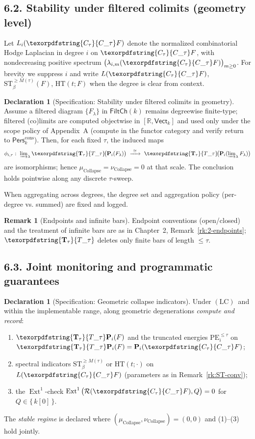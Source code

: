 \documentclass[11pt]{article}
\numberwithin{equation}{section}
\theoremstyle{plain}
\theoremstyle{definition}
\theoremstyle{remark}
\DeclareMathOperator{\Ext}{Ext}
\DeclareRobustCommand{\hyp}{\nobreakdash-}
\newcommand{\Pers}{\mathsf{Pers}}
\newcommand{\Rfun}{\mathcal{R}}
\theoremstyle{plain}
\theoremstyle{definition}
\numberwithin{equation}{section}
\theoremstyle{definition}
\newtheorem{remark}[theorem]{Remark}
\newtheorem{declaration}[theorem]{Declaration}
\DeclareRobustCommand{\FiltCh}[1]{\mathsf{FiltCh}(#1)}
\DeclareRobustCommand{\Ttau}{\texorpdfstring{\ensuremath{\mathbf{T}_{\tau}}}{T\_\tau}}
\DeclareRobustCommand{\Ctau}{\texorpdfstring{\ensuremath{C_{\tau}}}{C\_\tau}}
\DeclareRobustCommand{\muc}{\mu_{\mathrm{Collapse}}}
\DeclareRobustCommand{\nuc}{\nu_{\mathrm{Collapse}}}
\DeclareRobustCommand{\LC}{\texorpdfstring{\ensuremath{\mathrm{(LC)}}}{(LC)}}
\DeclareRobustCommand{\Qtest}{\{\,k[0]\,\}}
\numberwithin{equation}{section}
\theoremstyle{plain}
\theoremstyle{definition}
\theoremstyle{remark}
\providecommand{\Cfun}[1]{\mathsf{C}_{#1}}
\providecommand{\Tfun}[1]{\mathbf{T}_{#1}}
\providecommand{\Ctau}{\Cfun{\tau}}
\providecommand{\Ttau}{\Tfun{\tau}}
\providecommand{\muc}{\mu_{\mathrm{Collapse}}}
\providecommand{\nuc}{\nu_{\mathrm{Collapse}}}
\begin{document}
\subsection*{6.2. Stability under filtered colimits (geometry level)}
Let \(L_i(\Ctau F)\) denote the normalized combinatorial Hodge Laplacian in degree \(i\) on \(\Ctau F\), with nondecreasing positive spectrum \(\bigl(\lambda_{i,m}(\Ctau F)\bigr)_{m\ge 0}\). For brevity we suppress \(i\) and write \(L(\Ctau F)\), \(\mathrm{ST}_{\beta}^{\ge M(\tau)}(F)\), \(\mathrm{HT}(t;F)\) when the degree is clear from context.
\begin{declaration}[Specification: Stability under filtered colimits in geometry]\label{spec:geom-colim}
Assume a filtered diagram \(\{F_\lambda\}\) in \(\FiltCh{k}\) remains degreewise finite\hyp type; filtered (co)limits are computed objectwise in \([\mathbb{R},\mathsf{Vect}_k]\) and used only under the scope policy of Appendix~A (compute in the functor category and verify return to \(\Pers^{\mathrm{cons}}_k\)).
Then, for each fixed \(\tau\), the induced maps
\[
  \phi_{i,\tau}:\ \varinjlim\nolimits_\lambda \Ttau\!\big(\mathbf{P}_i(F_\lambda)\big)\ \xrightarrow{\ \cong\ }\ \Ttau\!\big(\mathbf{P}_i(\varinjlim\nolimits_\lambda F_\lambda)\big)
\]
are isomorphisms; hence \(\muc=\nuc=0\) at that scale. The conclusion holds pointwise along any discrete \(\tau\)\hyp sweep.
\end{declaration}

When aggregating across degrees, the degree set and aggregation policy (per-degree vs. summed) are fixed and logged.

\begin{remark}[Endpoints and infinite bars]\label{rk:endpoints-ch6}
Endpoint conventions (open/closed) and the treatment of infinite bars are as in Chapter~2, Remark~\ref{rk:2-endpoints}; \(\Ttau\) deletes only finite bars of length \(\le\tau\).
\end{remark}

\subsection*{6.3. Joint monitoring and programmatic guarantees}
\begin{declaration}[Specification: Geometric collapse indicators]\label{spec:geom-indicators}
Under \LC\ and within the implementable range, along geometric degenerations \emph{compute and record}:
\begin{enumerate}
  \item \(\Ttau\mathbf{P}_i(F)\) and the truncated energies \(\mathrm{PE}_i^{\le\tau}\) on \(\Ttau\mathbf{P}_i(F)=\mathbf{P}_i(\Ctau F)\);
  \item spectral indicators \(\mathrm{ST}_{\beta}^{\ge M(\tau)}\) or \(\mathrm{HT}(t;\cdot)\) on \(L(\Ctau F)\) (parameters as in Remark~\ref{rk:ST-conv});
  \item the \(\Ext^1\)\hyp check \(\Ext^1\big(\Rfun(\Ctau F),Q\big)=0\) for \(Q\in\Qtest\).
\end{enumerate}
The \emph{stable regime} is declared where \((\muc,\nuc)=(0,0)\) and (1)–(3) hold jointly.
\end{declaration}
\end{document}
